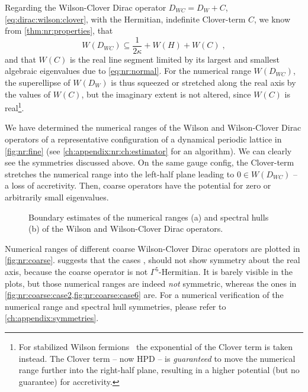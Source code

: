 Regarding the Wilson-Clover Dirac operator $D_{WC} = D_W + C$, \cref{eq:dirac:wilson:clover}, with the Hermitian,  indefinite Clover-term $C$, we know from \cref{thm:nr:properties}, that
\begin{equation}
W(D_{WC}) \subseteq  \frac{1}{2 \kappa} + W(H) + W(C) \;,
\end{equation}
and that $W(C)$ is the real line segment limited by its largest and smallest algebraic eigenvalues due to \cref{eq:nr:normal}.
For the numerical range $W(D_{WC})$, the superellipse of $W(D_{W})$ is thus squeezed or stretched along the real axis by the values of $W(C)$, but the  imaginary extent is not altered, since $W(C)$ is real\footnote{For stabilized Wilson fermions~\cite{Francis:2019muy} the exponential of the Clover term is taken instead. The Clover term -- now HPD -- is \emph{guaranteed} to move the numerical range further into the right-half plane, resulting in a higher potential (but no guarantee) for accretivity.}.

We have determined the numerical ranges of the Wilson and Wilson-Clover Dirac operators of a representative configuration of a dynamical periodic lattice in \cref{fig:nr:fine} (see \cref{ch:appendix:nr:ch:estimator} for an algorithm).
We can clearly see the symmetries discussed above.
On the same gauge config, the Clover-term stretches the numerical range into the left-half plane leading to $0 \in W(D_{WC})$ -- a loss of accretivity.
Then, coarse operators have the potential for zero or arbitrarily small eigenvalues.

\begin{figure}
\centering

\hfill
{}

\caption{
Boundary estimates of the numerical ranges (a) and spectral hulls (b) of the Wilson and Wilson-Clover Dirac operators.
}
\label{fig:fine}
\end{figure}

Numerical ranges of different coarse Wilson-Clover Dirac operators are plotted in \cref{fig:nr:coarse}.
 suggests that the cases , should not show symmetry about the real axis, because the coarse operator is not $\Gamma^{5}$-Hermitian.
It is barely visible in the plots, but those numerical ranges are indeed \emph{not} symmetric, whereas the ones in \cref{fig:nr:coarse:case2,fig:nr:coarse:case6} are.
For a numerical verification of the numerical range and spectral hull symmetries, please refer to \cref{ch:appendix:symmetries}.

